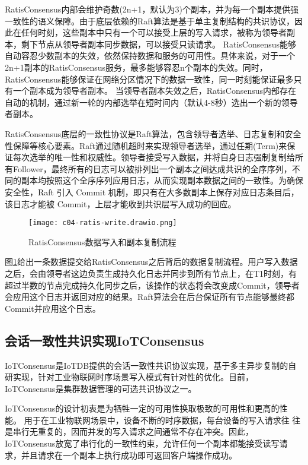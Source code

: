 RatisConsensus内部会维护奇数(2n+1，默认为3)个副本，并为每一个副本提供强一致性的语义保障。由于底层依赖的Raft算法是基于单主复制结构的共识协议，因此在任何时刻，这些副本中只有一个可以接受上层的写入请求，被称为领导者副本，剩下节点从领导者副本同步数据，可以接受只读请求。
RatisConsensus能够自动容忍少数副本的失效，依然保持数据和服务的可用性。具体来说，对于一个2n+1副本的RatisConsensus服务，最多能够容忍n个副本的失效。同时，RatisConsensus能够保证在网络分区情况下的数据一致性，同一时刻能保证最多只有一个副本成为领导者副本。
当领导者副本失效之后，RatisConsensus内部存在自动\failover 的机制，通过新一轮的内部选举在短时间内（默认4-8秒）选出一个新的领导者副本。

RatisConsensus底层的一致性协议是Raft算法，包含领导者选举、日志复制和安全性保障等核心要素。Raft通过随机超时来实现领导者选举，通过任期(Term)来保证每次选举的唯一性和权威性。领导者接受写入数据，并将自身日志强制复制给所有Follower，最终所有的日志可以被排列出一个副本之间达成共识的全序序列，不同的副本均按照这个全序序列应用日志，从而实现副本数据之间的一致性。为确保安全性，Raft 引入 Commit 机制，即只有在大多数副本上保存对应日志条目后，该日志才能被 Commit，上层才能收到共识层写入成功的回应。

\begin{figure}
  \centering
  \texttt{[image: c04-ratis-write.drawio.png]}
  \caption{RatisConsensus数据写入和副本复制流程}
  \label{fig:c04-ratis-write}
\end{figure}

图\ref{fig:c04-ratis-write}给出一条数据提交给RatisConsensus之后背后的数据复制流程。用户写入数据之后，会由领导者这边负责生成持久化日志并同步到所有节点上，在T1时刻，有超过半数的节点完成持久化同步之后，该操作的状态将会改变成Commit，领导者会应用这个日志并返回对应的结果。Raft算法会在后台保证所有节点能够最终都Commit并应用这个日志。



\subsection{会话一致性共识实现IoTConsensus}

IoTConsensus是IoTDB提供的会话一致性共识协议实现，基于多主异步复制的自研实现，针对工业物联网时序场景写入模式有针对性的优化。目前，IoTConsensus是集群数据管理的可选共识协议之一。

IoTConsensus的设计初衷是为牺牲一定的可用性换取极致的可用性和更高的性能。
用于在工业物联网场景中，设备不断的时序数据，每台设备的写入请求往
往是串行无重复的，因而并发的写入请求之间通常不存在冲突。因此，IoTConsensus放宽了串行化的一致性约束，允许任何一个副本都能接受读写请求，并且请求在一个副本上执行成功即可返回客户端操作成功。


